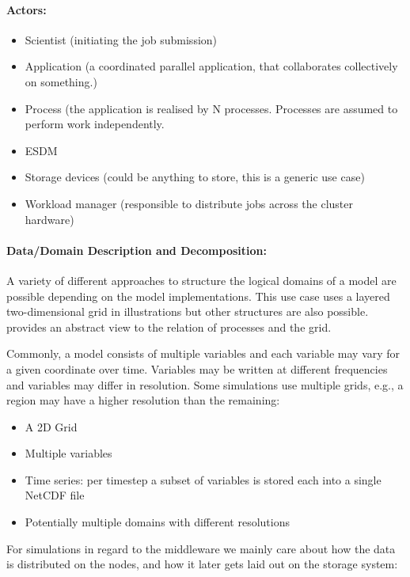 \paragraph{Actors:}
\begin{itemize}
	\item Scientist (initiating the job submission)
	\item Application (a coordinated parallel application, that collaborates collectively on something.)
	\item Process (the application is realised by N processes. Processes are assumed to perform work independently.
	\item ESDM
	\item Storage devices (could be anything to store, this is a generic use case)
	\item Workload manager (responsible to distribute jobs across the cluster hardware)
\end{itemize}


\paragraph{Data/Domain Description and Decomposition:}
A variety of different approaches to structure the logical domains of a model are possible depending on the model implementations.
This use case uses a layered two-dimensional grid in illustrations but other structures are also possible.
 provides an abstract view to the relation of processes and the grid.

Commonly, a model consists of multiple variables and each variable may vary for a given coordinate over time.
Variables may be written at different frequencies and variables may differ in resolution.
Some simulations use multiple grids, e.g., a region may have a higher resolution than the remaining:

\begin{itemize}
	\item A 2D Grid
	\item Multiple variables
	\item Time series: per timestep a subset of variables is stored each into a single NetCDF file
	\item Potentially multiple domains with different resolutions
\end{itemize}


For simulations in regard to the middleware we mainly care about how the data is distributed on the nodes, and how it later gets laid out on the storage system:

